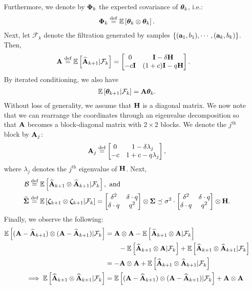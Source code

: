 \noindent Furthermore, we denote by $\boldsymbol{\Phi}_k$ the expected covariance of $\boldsymbol{\theta}_k$, i.e.:
\begin{align*}
\boldsymbol{\Phi}_k\stackrel{\mathrm{def}}{=}\mathbb{E}\left[\boldsymbol{\theta}_k\otimes\boldsymbol{\theta}_k\right].
\end{align*}
Next, let $\mathcal{F}_k$ denote the filtration generated by samples $\{(\mathbf{a}_1,b_1),\cdots, (\mathbf{a}_k,b_k)\}$. Then,
\begin{align*}
\mathbf{A}&\stackrel{\textrm{def}}{=} \mathbb{E}\left[\widehat{\mathbf{A}}_{k+1}|\mathcal{F}_{k}\right]=\begin{bmatrix}
0 & \mathbf{I} - \delta \mathbf{H} \\ -c\mathbf{I} & (1+c)\mathbf{I} - q\mathbf{H}
\end{bmatrix}.
\end{align*}
By iterated conditioning, we also have
\begin{align}\label{eqn:theta-det}
	\mathbb{E}\left[\boldsymbol{\theta}_{k+1}\middle \vert \mathcal{F}_{k}\right] = \mathbf{A} \boldsymbol{\theta}_k.
\end{align}
Without loss of generality, we assume that $\mathbf{H}$ is a diagonal matrix. We now note that we can rearrange the coordinates through an eigenvalue decomposition so that $\mathbf{A}$ becomes a block-diagonal matrix with $2\times2$ blocks. We denote the $j^{\textrm{th}}$ block by $\mathbf{A}_j$:
\begin{align*}
\mathbf{A}_j \stackrel{\textrm{def}}{=} \begin{bmatrix}
0 & 1 - \delta \lambda_j \\ -c & 1+c - q \lambda_j
\end{bmatrix},
\end{align*}
where $\lambda_j$ denotes the $j^{\textrm{th}}$ eigenvalue of $\mathbf{H}$.
Next, 
\begin{align*}
\mathcal{B}&\stackrel{\textrm{def}}{=} \mathbb{E}\left[\widehat{\mathbf{A}}_{k+1}\otimes\widehat{\mathbf{A}}_{k+1}|\mathcal{F}_{k}\right], \mbox{ and }\\
\mathbf{\widehat{\Sigma}}&\stackrel{\textrm{def}}{=} \mathbb{E}\left[\boldsymbol{\zeta}_{k+1}\otimes\boldsymbol{\zeta}_{k+1}|\mathcal{F}_k\right] = \begin{bmatrix}\delta^2&\delta\cdot q\\\delta\cdot q&q^2\end{bmatrix}\otimes\mathbf{\Sigma}\preceq\sigma^2\cdot\begin{bmatrix}\delta^2&\delta\cdot q\\\delta\cdot q&q^2\end{bmatrix}\otimes\mathbf{H}.
\end{align*}
Finally, we observe the following:
\begin{align*}
\mathbb{E}\left[(\mathbf{A}-\widehat{\mathbf{A}}_{k+1})\otimes(\mathbf{A}-\widehat{\mathbf{A}}_{k+1})|\mathcal{F}_k\right]&=\mathbf{A}\otimes\mathbf{A}-\mathbb{E}\left[\widehat{\mathbf{A}}_{k+1}\otimes\mathbf{A}|\mathcal{F}_k\right]\\&\quad\quad-\mathbb{E}\left[\widehat{\mathbf{A}}_{k+1}\otimes\mathbf{A}|\mathcal{F}_k\right]+\mathbb{E}\left[\widehat{\mathbf{A}}_{k+1}\otimes\widehat{\mathbf{A}}_{k+1}|\mathcal{F}_k\right]\\
&=-\mathbf{A}\otimes\mathbf{A}+\mathbb{E}\left[\widehat{\mathbf{A}}_{k+1}\otimes\widehat{\mathbf{A}}_{k+1}|\mathcal{F}_k\right]\\
\implies \mathbb{E}\left[\widehat{\mathbf{A}}_{k+1}\otimes\widehat{\mathbf{A}}_{k+1}|\mathcal{F}_k\right]&=\mathbb{E}\left[(\mathbf{A}-\widehat{\mathbf{A}}_{k+1})\otimes(\mathbf{A}-\widehat{\mathbf{A}}_{k+1})|\mathcal{F}_k\right]+\mathbf{A}\otimes\mathbf{A}
\end{align*}
